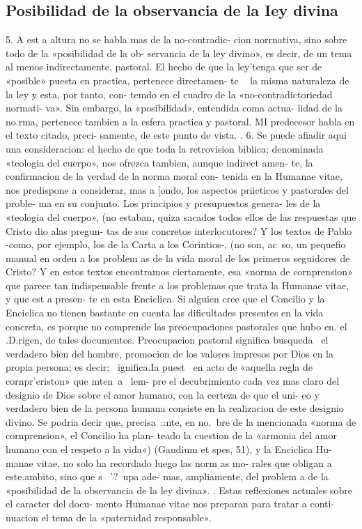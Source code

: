 \documentclass[letterpaper]{report}
\begin{document}
		\subsection{Posibilidad de la observancia de la Iey divina}
			5. A est a altura no se habla mas de la no-contradic- 
			cion norrnativa, sino sobre todo de la «posibilidad de la ob- 
			servancia de la ley divino», es decir, de un tema al menos 
			indirectamente, pastoral. El hecho de que la ley'tenga que 
			ser de «posible» puesta en practica, pertenece directamen- 
			te ~ la misma naturaleza de la ley y esta, por tanto, con- 
			temdo en el cuadro de la «no-contradictoriedad normati- 
			va». Sin embargo, la «posibilidad», entendida coma actua- 
			lidad de la no.rma, pertenece tambien a la esfera practica 
			y pastoral. MI predecesor habla en el texto citado, preci- 
			samente, de este punto de vista. 
			. 6. Se puede afiadir aqui una consideracion: el hecho 
			de que toda la retrovision biblica; denominada «teologia 
			del cuerpo», nos ofrezca tambien, aunque indirect amen- 
			te, la confirmacion de la verdad de la norma moral con- 
			tenida en la Humanae vitae, nos predispone a considerar, 
			mas a [ondo, los aspectos priicticos y pastorales del proble- 
			ma en su conjunto. Los principios y presupuestos genera- 
			les de la «teologia del cuerpo», (no estaban, quiza sacados 
			todos ellos de las respuestas que Cristo dio alas pregun- 
			tas de sus concretos interlocutores? Y los textos de Pablo 
			-como, por ejemplo, los de la Carta a los Corintios-, (no 
			son, ac~so, un pequefio manual en orden a los problem as 
			de la vida moral de los primeros seguidores de Cristo? Y 
			en estos textos encontramos ciertamente, esa «norma de 
			cornprension» que parece tan indispensable frente a los 
			problemas que trata la Humanae vitae, y que est a presen- 
			te en esta Enciclica. 
			Si alguien cree que el Concilio y la Enciclica no tienen 
			bastante en cuenta las dificultades presentes en la vida 
			concreta, es porque no comprende las preocupaciones 
			pastorales que hubo en. el .D.rigen, de tales documentos. 
			Preocupacion pastoral significa busqueda ~el verdadero 
			bien del hombre, promocion de los valores impresos por 
			Dios en la propia persona; es decir; ~ignifica.Ia puest~ en 
			acto de «aquella regla de cornpr'eriston» que mten~a ~lem- 
			pre el decubrimiento cada vez mas claro del designio de 
			Dios sobre el amor humano, con la certeza de que el uni- 
			eo y verdadero bien de la persona humana consiste en la 
			realizacion de este designio divino. 
			Se podria decir que, precisa~::nte, en no.~bre de la 
			mencionada «norma de cornprension», el Concilio ha plan- 
			teado la cuestion de la «armonia del amor humano con el 
			respeto a la vida«) (Gaudium et spes, 51), y la Enciclica Hu- 
			manae vitae, no solo ha recordado luego las norm as mo- 
			rales que obligan a este.ambito, sino que s~ '?~upa ade- 
			mas, ampliamente, del problem a de la «posibilidad de la 
				observancia de la ley divina». 	. 
			Estas reflexiones actuales sobre el caracter del docu- 
			mento Humanae vitae nos preparan para tratar a conti- 
			nuacion el tema de la «paternidad responsable». 
	
\end{document}
